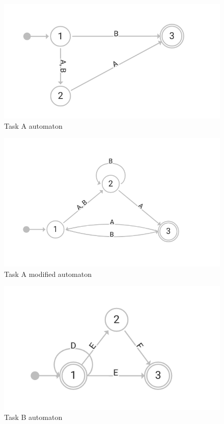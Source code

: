 \begin{figure}
    \includegraphics[width=\textwidth]{basic_automaton}
    \caption{Task A automaton}\label{task-a-automaton}
\end{figure}

\begin{figure}
    \includegraphics[width=\textwidth]{basic_automaton_2}
    \caption{Task A modified automaton}\label{task-a-automaton-modified}
\end{figure}

\begin{figure}
    \includegraphics[width=\textwidth]{automaton_cycle}
    \caption{Task B automaton}\label{task-b-automaton}
\end{figure}

